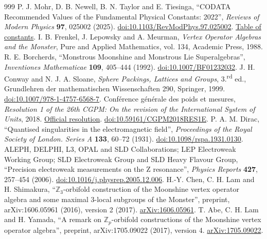 \begin{thebibliography}{999}
 P. J. Mohr, D. B. Newell, B. N. Taylor and E. Tiesinga, ``CODATA Recommended Values of the Fundamental Physical Constants: 2022'', \emph{Reviews of Modern Physics} \textbf{97}, 025002 (2025). \href{https://doi.org/10.1103/RevModPhys.97.025002}{doi:10.1103/RevModPhys.97.025002}. \href{https://physics.nist.gov/cuu/Constants/Table/allascii.txt}{Table of constants}.
 I. B. Frenkel, J. Lepowsky and A. Meurman, \emph{Vertex Operator Algebras and the Monster}, Pure and Applied Mathematics, vol. 134, Academic Press, 1988.
 R. E. Borcherds, ``Monstrous Moonshine and Monstrous Lie Superalgebras'', \emph{Inventiones Mathematicae} \textbf{109}, 405--444 (1992). \href{https://doi.org/10.1007/BF01232032}{doi:10.1007/BF01232032}.
 J. H. Conway and N. J. A. Sloane, \emph{Sphere Packings, Lattices and Groups}, 3.\textsuperscript{rd} ed., Grundlehren der mathematischen Wissenschaften 290, Springer, 1999. \href{https://doi.org/10.1007/978-1-4757-6568-7}{doi:10.1007/978-1-4757-6568-7}.
 Conférence générale des poids et mesures, \emph{Resolution 1 of the 26th CGPM: On the revision of the International System of Units}, 2018. \href{https://www.bipm.org/en/committees/cg/cgpm/26-2018/resolution-1}{Official resolution}. \href{https://doi.org/10.59161/CGPM2018RES1E}{doi:10.59161/CGPM2018RES1E}.
 P. A. M. Dirac, ``Quantised singularities in the electromagnetic field'', \emph{Proceedings of the Royal Society of London. Series A} \textbf{133}, 60--72 (1931). \href{https://doi.org/10.1098/rspa.1931.0130}{doi:10.1098/rspa.1931.0130}.
 ALEPH, DELPHI, L3, OPAL and SLD Collaborations; LEP Electroweak Working Group; SLD Electroweak Group and SLD Heavy Flavour Group, ``Precision electroweak measurements on the Z resonance'', \emph{Physics Reports} \textbf{427}, 257--454 (2006). \href{https://doi.org/10.1016/j.physrep.2005.12.006}{doi:10.1016/j.physrep.2005.12.006}.
 H.-Y. Chen, C. H. Lam and H. Shimakura, ``\(\mathbb Z_3\)-orbifold construction of the Moonshine vertex operator algebra and some maximal \(3\)-local subgroups of the Monster'', preprint, arXiv:1606.05961 (2016), version 2 (2017). \href{https://arxiv.org/abs/1606.05961}{arXiv:1606.05961}.
 T. Abe, C. H. Lam and H. Yamada, ``A remark on \(\mathbb Z_p\)-orbifold constructions of the Moonshine vertex operator algebra'', preprint, arXiv:1705.09022 (2017), version 4. \href{https://arxiv.org/abs/1705.09022v4}{arXiv:1705.09022}.

\end{thebibliography}
